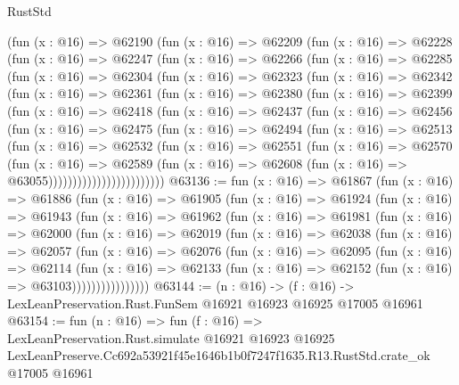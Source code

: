 \begin{lexlean}{RustStd}
\begin{coremodule}
    (fun (x : @16) =>
    @62190
      (fun (x : @16) =>
      @62209
        (fun (x : @16) =>
        @62228
          (fun (x : @16) =>
          @62247
            (fun (x : @16) =>
            @62266
              (fun (x : @16) =>
              @62285
                (fun (x : @16) =>
                @62304
                  (fun (x : @16) =>
                  @62323
                    (fun (x : @16) =>
                    @62342
                      (fun (x : @16) =>
                      @62361
                        (fun (x : @16) =>
                        @62380
                          (fun (x : @16) =>
                          @62399
                            (fun (x : @16) =>
                            @62418
                              (fun (x : @16) =>
                              @62437
                                (fun (x : @16) =>
                                @62456
                                  (fun (x : @16) =>
                                  @62475
                                    (fun (x : @16) =>
                                    @62494
                                      (fun (x : @16) =>
                                      @62513
                                        (fun (x : @16) =>
                                        @62532
                                          (fun (x : @16) =>
                                          @62551
                                            (fun (x : @16) =>
                                            @62570
                                              (fun (x : @16) =>
                                              @62589
                                                (fun (x : @16) =>
                                                @62608
                                                  (fun (x : @16) => @63055))))))))))))))))))))))))
@63136 := fun (x : @16) =>
  @61867
    (fun (x : @16) =>
    @61886
      (fun (x : @16) =>
      @61905
        (fun (x : @16) =>
        @61924
          (fun (x : @16) =>
          @61943
            (fun (x : @16) =>
            @61962
              (fun (x : @16) =>
              @61981
                (fun (x : @16) =>
                @62000
                  (fun (x : @16) =>
                  @62019
                    (fun (x : @16) =>
                    @62038
                      (fun (x : @16) =>
                      @62057
                        (fun (x : @16) =>
                        @62076
                          (fun (x : @16) =>
                          @62095
                            (fun (x : @16) =>
                            @62114
                              (fun (x : @16) =>
                              @62133
                                (fun (x : @16) => @62152 (fun (x : @16) => @63103))))))))))))))))
@63144 := (n : @16) ->
  (f : @16) -> LexLeanPreservation.Rust.FunSem @16921 @16923 @16925 @17005 @16961
@63154 := fun (n : @16) =>
  fun (f : @16) =>
  LexLeanPreservation.Rust.simulate
    @16921
    @16923
    @16925
    LexLeanPreserve.Cc692a53921f45e1646b1b0f7247f1635.R13.RustStd.crate_ok
    @17005
    @16961
\end{coremodule}
\end{lexlean}
